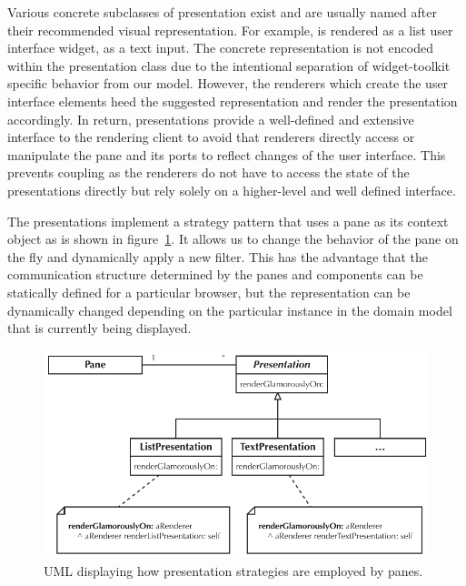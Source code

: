 \documentclass[a4paper,10pt,twoside]{book}
\begin{document}
Various concrete subclasses of presentation exist and are usually named after their recommended visual representation. For example,  is rendered as a list user interface widget,  as a text input. The concrete representation is not encoded within the presentation class due to the intentional separation of widget-toolkit specific behavior from our model. However, the renderers which create the user interface elements heed the suggested representation and render the presentation accordingly. In return, presentations provide a well-defined and extensive interface to the rendering client to avoid that renderers directly access or manipulate the pane and its ports to reflect changes of the user interface. This prevents coupling as the renderers do not have to access the state of the presentations directly but rely solely on a higher-level and well defined interface.

The presentations implement a strategy pattern that uses a pane as its
context object as is shown in figure~\ref{fig:uml-strategy}. It allows
us to change the behavior of the pane on the fly and dynamically apply
a new filter. This has the advantage that the communication structure
determined by the panes and components can be statically defined for a
particular browser, but the representation can be dynamically changed
depending on the particular instance in the domain model that is
currently being displayed.

\begin{figure}[htbp]
\centerline{\includegraphics[width=\linewidth]{uml_strategy.pdf}}
\caption{UML displaying how presentation strategies are employed by panes.}
\label{fig:uml-strategy}
\end{figure}


\end{document}
